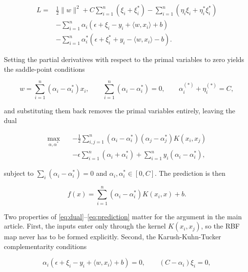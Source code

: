 \documentclass[pdflatex,sn-basic,Numbered]{sn-jnl}
\begin{document}
\begin{align}
L = {}& \frac{1}{2}\|w\|^{2} + C\sum_{i=1}^{n}(\xi_i + \xi_i^{*})
      - \sum_{i=1}^{n}(\eta_i\xi_i + \eta_i^{*}\xi_i^{*}) \nonumber\\
  & - \sum_{i=1}^{n}\alpha_i\!\left(\epsilon + \xi_i - y_i
      + \langle w, x_i\rangle + b\right) \nonumber\\
  & - \sum_{i=1}^{n}\alpha_i^{*}\!\left(\epsilon + \xi_i^{*} + y_i
      - \langle w, x_i\rangle - b\right).
\label{eq:lagrangian}
\end{align}

Setting the partial derivatives with respect to the primal variables to zero
yields the saddle-point conditions

\begin{equation}
w = \sum_{i=1}^{n}(\alpha_i - \alpha_i^{*})x_i, \qquad
\sum_{i=1}^{n}(\alpha_i - \alpha_i^{*}) = 0, \qquad
\alpha_i^{(*)} + \eta_i^{(*)} = C,
\label{eq:saddle}
\end{equation}

and substituting them back removes the primal variables entirely, leaving the
dual

\begin{align}
\max_{\alpha,\alpha^{*}} \quad
& -\frac{1}{2}\sum_{i,j=1}^{n}(\alpha_i - \alpha_i^{*})(\alpha_j - \alpha_j^{*})
   K(x_i,x_j) \nonumber\\
& - \epsilon\sum_{i=1}^{n}(\alpha_i + \alpha_i^{*})
  + \sum_{i=1}^{n}y_i(\alpha_i - \alpha_i^{*}),
\label{eq:dual}
\end{align}

subject to $\sum_i (\alpha_i - \alpha_i^{*}) = 0$ and
$\alpha_i, \alpha_i^{*} \in [0, C]$. The prediction is then

\begin{equation}
f(x) = \sum_{i=1}^{n}(\alpha_i - \alpha_i^{*})K(x_i, x) + b.
\label{eq:prediction}
\end{equation}

Two properties of \eqref{eq:dual}--\eqref{eq:prediction} matter for the
argument in the main article. First, the inputs enter only through the kernel
$K(x_i,x_j)$, so the RBF map never has to be formed explicitly. Second, the
Karush-Kuhn-Tucker complementarity conditions

\begin{equation}
\alpha_i(\epsilon + \xi_i - y_i + \langle w,x_i\rangle + b) = 0, \qquad
(C - \alpha_i)\xi_i = 0,
\label{eq:kkt}
\end{equation}
\end{document}
